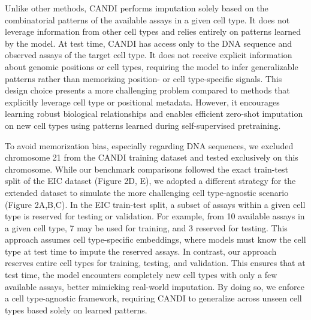 Unlike other methods, CANDI performs imputation solely based on the combinatorial patterns of the available assays in a given cell type. It does not leverage information from other cell types and relies entirely on patterns learned by the model. At test time, CANDI has access only to the DNA sequence and observed assays of the target cell type. It does not receive explicit information about genomic positions or cell types, requiring the model to infer generalizable patterns rather than memorizing position- or cell type-specific signals. This design choice presents a more challenging problem compared to methods that explicitly leverage cell type or positional metadata. However, it encourages learning robust biological relationships and enables efficient zero-shot imputation on new cell types using patterns learned during self-supervised pretraining.

To avoid memorization bias, especially regarding DNA sequences, we excluded chromosome 21 from the CANDI training dataset and tested exclusively on this chromosome. While our benchmark comparisons followed the exact train-test split of the EIC dataset (Figure 2D, E), we adopted a different strategy for the extended dataset to simulate the more challenging cell type-agnostic scenario (Figure 2A,B,C). In the EIC train-test split, a subset of assays within a given cell type is reserved for testing or validation. For example, from 10 available assays in a given cell type, 7 may be used for training, and 3 reserved for testing. This approach assumes cell type-specific embeddings, where models must know the cell type at test time to impute the reserved assays. In contrast, our approach reserves entire cell types for training, testing, and validation. This ensures that at test time, the model encounters completely new cell types with only a few available assays, better mimicking real-world imputation. By doing so, we enforce a cell type-agnostic framework, requiring CANDI to generalize across unseen cell types based solely on learned patterns.



